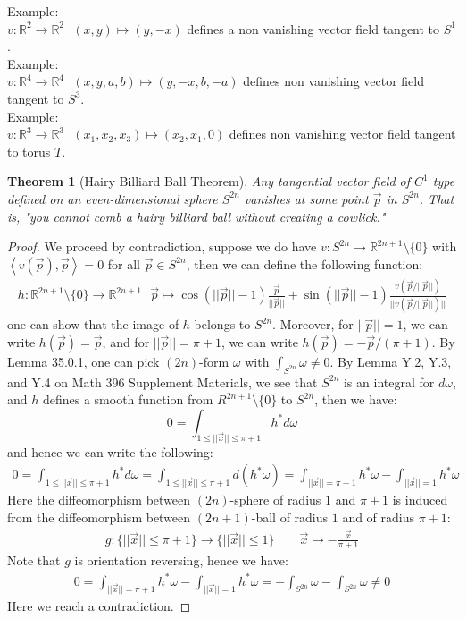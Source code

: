 \documentclass[11pt,oneside]{book}
\theoremstyle{break}
\theoremstyle{break}
\newtheorem{thm}{Theorem}[section]
\newcommand{\R}{\mathbb{R}}
\newcommand{\example}{\color{green}Example: \color{black}}
\begin{document}
\example\\
$v:\R^2 \to \R^2 \ \ \ (x,y)\mapsto (y,-x)$ defines a non vanishing vector field tangent to $S^1$.\\

\example\\
$v:\R^4 \to \R^4 \ \ \ (x,y,a,b)\mapsto(y,-x, b, -a)$ defines non vanishing vector field tangent to $S^3$.\\

\example\\
$v:\R^3 \to \R^3 \ \ \ (x_1,x_2,x_3)\mapsto(x_2,x_1,0)$ defines non vanishing vector field tangent to torus $T$.\\


\begin{thm}[Hairy Billiard Ball Theorem]
Any tangential vector field of $C^1$ type defined on an even-dimensional sphere $S^{2n}$ vanishes at some point $\vec{p}$ in $S^{2n}$. That is, "you cannot comb a hairy billiard ball without creating a cowlick."
\end{thm}
\begin{proof}
We proceed by contradiction, suppose we do have $v:S^{2n} \to \R^{2n+1}\setminus \{0\}$ with $\left<v(\vec{p}), \vec{p}\right> = 0$ for all $\vec{p}\in S^{2n}$, then we can define the following function:
\begin{align*}
h: \R^{2n+1}\setminus \{0\} \to \R^{2n+1} \ \ \ \vec{p}\mapsto\cos(||\vec{p}||-1) \frac{\vec{p}}{||\vec{p}||} + \sin(||\vec{p}||-1) \frac{v(\vec{p}/||\vec{p}||)}{||v(\vec{p}/||\vec{p}||)||}
\end{align*}
one can show that the image of $h$ belongs to $S^{2n}$. Moreover, for $||\vec{p}|| = 1$, we can write $h(\vec{p}) = \vec{p}$, and for $||\vec{p}|| = \pi +1$, we can write $h(\vec{p}) = -\vec{p}/(\pi+1)$. By Lemma 35.0.1, one can pick $(2n)$-form $\omega$ with $\int_{S^{2n}}\omega \neq 0$. By Lemma Y.2, Y.3, and Y.4 on Math 396 Supplement Materials, we see that $S^{2n}$ is an integral for $d\omega$, and $h$ defines a smooth function from $R^{2n+1}\setminus \{0\}$ to $S^{2n}$, then we have: 
$$0 = \int_{1\leq ||\vec{x}|| \leq {\pi+1}} h^*d\omega $$ 
and hence we can write the following:
\begin{align*}
0 = \int_{1\leq ||\vec{x}|| \leq {\pi+1}} h^*d\omega = \int_{1\leq ||\vec{x}|| \leq \pi+1} d(h^*\omega) = \int_{||\vec{x}|| = \pi+1}h^*\omega - \int_{||\vec{x}||=1} h^*\omega
\end{align*}
Here the diffeomorphism between $(2n)$-sphere of radius $1$ and $\pi+1$ is induced from the diffeomorphism between $(2n+1)$-ball of radius $1$ and of radius $\pi+1$:
\begin{align*}
g: \{||\vec{x}||\leq \pi+1\} \to \{ ||\vec{x}||\leq 1\} \qquad \vec{x}\mapsto - \frac{\vec{x}}{\pi+1}
\end{align*}
Note that $g$ is orientation reversing, hence we have:
\begin{align*}
0 = \int_{||\vec{x}|| = \pi+1}h^*\omega - \int_{||\vec{x}||=1} h^*\omega  =-\int_{S^{2n}}\omega - \int_{S^{2n}}\omega   \neq 0 
\end{align*}
Here we reach a contradiction. 
\end{proof}
\end{document}
